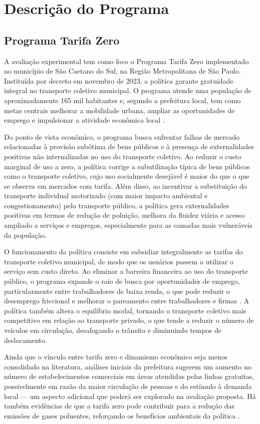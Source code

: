 
\section{Descrição do Programa}

\subsection{Programa Tarifa Zero}
A   avaliação experimental tem como foco o Programa Tarifa Zero implementado no município de São Caetano do Sul, na Região Metropolitana de São Paulo. Instituída por decreto em novembro de 2023, a política garante gratuidade integral no transporte coletivo municipal. O programa atende uma população de aproximadamente 165 mil habitantes e, segundo a prefeitura local, tem como metas centrais melhorar a mobilidade urbana, ampliar as oportunidades de emprego e impulsionar a atividade econômica local \cite{PREF_SCS}.

Do ponto de vista econômico, o programa busca enfrentar falhas de mercado relacionadas à provisão subótima de bens públicos e à presença de externalidades positivas não internalizadas no uso do transporte coletivo. Ao reduzir o custo marginal de uso a zero, a política corrige a subutilização típica de bens públicos como o transporte coletivo, cujo uso socialmente desejável é maior do que o que se observa em mercados com tarifa. Além disso, ao incentivar a substituição do transporte individual motorizado (com maior impacto ambiental e congestionamento) pelo transporte público, a política gera externalidades positivas em termos de redução de poluição, melhora da fluidez viária e acesso ampliado a serviços e empregos, especialmente para as camadas mais vulneráveis da população.

O funcionamento da política consiste em subsidiar integralmente as tarifas do transporte coletivo municipal, de modo que os usuários passem a utilizar o serviço sem custo direto. Ao eliminar a barreira financeira ao uso do transporte público, o programa expande o raio de busca por oportunidades de emprego, particularmente entre trabalhadores de baixa renda, o que pode reduzir o desemprego friccional e melhorar o pareamento entre trabalhadores e firmas \cite{BETTER_FIRMS, NO_DAM}. A política também altera o equilíbrio modal, tornando o transporte coletivo mais competitivo em relação ao transporte privado, o que tende a reduzir o número de veículos em circulação, desafogando o trânsito e diminuindo tempos de deslocamento.

Ainda que o vínculo entre tarifa zero e dinamismo econômico seja menos consolidado na literatura, análises iniciais da prefeitura sugerem um aumento no número de estabelecimentos comerciais em áreas atendidas pelas linhas gratuitas, possivelmente em razão da maior circulação de pessoas e do estímulo à demanda local \cite{PREF_2024} — um aspecto adicional que poderá ser explorado na avaliação proposta. Há também evidências de que a tarifa zero pode contribuir para a redução das emissões de gases poluentes, reforçando os benefícios ambientais da política \cite{NO_DAM}.

